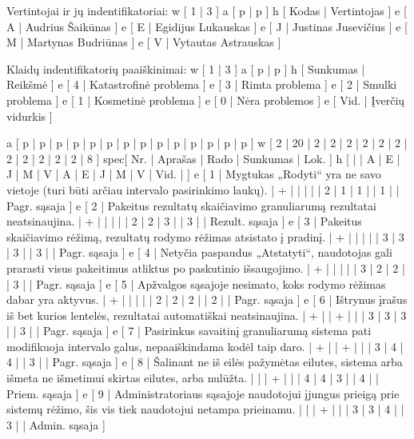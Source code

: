 Vertintojai ir jų indentifikatoriai:
\xtableu
{
  w [ 1 | 3 ]
  a [ p | p ]
  h [ Kodas | Vertintojas ]
  e [ A | Audrius Šaikūnas ]
  e [ E | Egidijus Lukauskas ]
  e [ J | Justinas Jusevičius ]
  e [ M | Martynas Budriūnas ]
  e [ V | Vytautas Astrauskas ]
}

Klaidų indentifikatorių paaiškinimai:
\xtableu
{
  w [ 1 | 3 ]
  a [ p | p ]
  h [ Sunkumas | Reikšmė ]
  e [ 4 | Katastrofinė problema ]
  e [ 3 | Rimta problema ]
  e [ 2 | Smulki problema ]
  e [ 1 | Kosmetinė problema ]
  e [ 0 | Nėra problemos ]
  e [ Vid. | Įverčių vidurkis ]
}

\xtableu
{
  a [ p   | p       | p | p | p | p | p | p | p | p | p | p | p    | p    ]
  w [ 2   | 20      | 2 | 2 | 2 | 2 | 2 | 2 | 2 | 2 | 2 | 2 | 2    | 8    ]
spec[ Nr. | Aprašas | Rado              | Sunkumas                 | Lok. ]
  h [     |         | A | E | J | M | V | A | E | J | M | V | Vid. |      ]
  e [ 1   | Mygtukas „Rodyti“ yra ne savo vietoje (turi būti arčiau intervalo
  pasirinkimo laukų).
                    | + |   |   |   |   | 2 | 1 | 1 |   | 1 |      | Pagr. sąsaja ]
  e [ 2   | Pakeitus rezultatų skaičiavimo granuliarumą rezultatai neatsinaujina.
                    | + |   |   |   |   | 2 | 2 | 3 |   | 3 |      | Rezult. sąsaja ]
  e [ 3   | Pakeitus skaičiavimo rėžimą, rezultatų rodymo rėžimas atsistato
  į pradinį.
                    | + |   |   |   |   | 3 | 3 | 3 |   | 3 |      | Pagr. sąsaja ]
  e [ 4   | Netyčia paspaudus „Atstatyti“, naudotojas gali prarasti visus pakeitimus
  atliktus po paskutinio išsaugojimo.
                    | + |   |   |   |   | 3 | 2 | 2 |   | 3 |      | Pagr. sąsaja ]
  e [ 5   | Apžvalgos sąsajoje nesimato, koks rodymo rėžimas dabar yra aktyvus.
                    | + |   |   |   |   | 2 | 2 | 2 |   | 2 |      | Pagr. sąsaja ]
  e [ 6   | Ištrynus įrašus iš bet kurios lentelės, rezultatai automatiškai neatsinaujina.
                    | + |   | + |   |   | 3 | 3 | 3 |   | 3 |      | Pagr. sąsaja ]
  e [ 7   | Pasirinkus savaitinį granuliarumą sistema pati modifikuoja intervalo galus,
  nepaaiškindama kodėl taip daro.
                    | + |   | + |   |   | 3 | 4 | 4 |   | 3 |      | Pagr. sąsaja ]
  e [ 8   | Šalinant ne iš eilės pažymėtas eilutes, sistema arba išmeta ne išmetimui
  skirtas eilutes, arba nulūžta.
                    |   |   | + |   |   | 4 | 4 | 3 |   | 4 |      | Priem. sąsaja ]
  e [ 9   | Administratoriaus sąsajoje naudotojui įjungus prieigą prie sistemų
  rėžimo, šis vis tiek naudotojui netampa prieinamu.
                    |   |   | + |   |   | 3 | 3 | 4 |   | 3 |      | Admin. sąsaja ]
}
